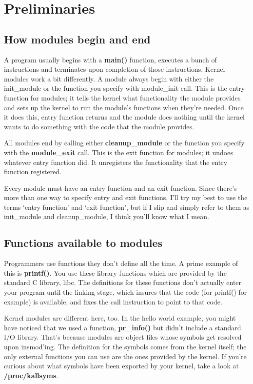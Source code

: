 \documentclass[10pt, oneside]{book}
\begin{document}
\section{Preliminaries}
\label{sec:org8c45a1a}
\subsection{How modules begin and end}
\label{sec:orgb317392}
A program usually begins with a \textbf{main()} function, executes a bunch of instructions and terminates upon completion of those instructions. Kernel modules work a bit differently. A module always begin with either the init\_module or the function you specify with module\_init call. This is the entry function for modules; it tells the kernel what functionality the module provides and sets up the kernel to run the module's functions when they're needed. Once it does this, entry function returns and the module does nothing until the kernel wants to do something with the code that the module provides.

All modules end by calling either \textbf{cleanup\_module} or the function you specify with the \textbf{module\_exit} call. This is the exit function for modules; it undoes whatever entry function did. It unregisters the functionality that the entry function registered.

Every module must have an entry function and an exit function. Since there's more than one way to specify entry and exit functions, I'll try my best to use the terms `entry function' and `exit function', but if I slip and simply refer to them as init\_module and cleanup\_module, I think you'll know what I mean.

\subsection{Functions available to modules}
\label{sec:org9ebe27a}
Programmers use functions they don't define all the time. A prime example of this is \textbf{printf()}. You use these library functions which are provided by the standard C library, libc. The definitions for these functions don't actually enter your program until the linking stage, which insures that the code (for printf() for example) is available, and fixes the call instruction to point to that code.

Kernel modules are different here, too. In the hello world example, you might have noticed that we used a function, \textbf{pr\_info()} but didn't include a standard I/O library. That's because modules are object files whose symbols get resolved upon insmod'ing. The definition for the symbols comes from the kernel itself; the only external functions you can use are the ones provided by the kernel. If you're curious about what symbols have been exported by your kernel, take a look at \textbf{/proc/kallsyms}.
\end{document}
